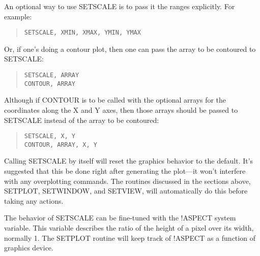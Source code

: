 An optional way to use SETSCALE is to pass it the ranges explicitly.  For
example:
\begin{quote}
\begin{verbatim}
SETSCALE, XMIN, XMAX, YMIN, YMAX
\end{verbatim}
\end{quote}
Or, if one's doing a contour plot, then one can pass the array to be contoured
to SETSCALE:
\begin{quote}
\begin{verbatim}
SETSCALE, ARRAY
CONTOUR, ARRAY
\end{verbatim}
\end{quote}
Although if CONTOUR is to be called with the optional arrays for the
coordinates along the X and Y axes, then those arrays should be passed to
SETSCALE instead of the array to be contoured:
\begin{quote}
\begin{verbatim}
SETSCALE, X, Y
CONTOUR, ARRAY, X, Y
\end{verbatim}
\end{quote}

Calling SETSCALE by itself will reset the graphics behavior to the default.
It's suggested that this be done right after generating the plot---it won't
interfere with any overplotting commands.  The routines discussed in the
sections above, SETPLOT, SETWINDOW, and SETVIEW, will automatically do this
before taking any actions.

The behavior of SETSCALE can be fine-tuned with the !ASPECT system variable.
This variable describes the ratio of the height of a pixel over its width,
normally 1.  The SETPLOT routine will keep track of !ASPECT as a function of
graphics device.


